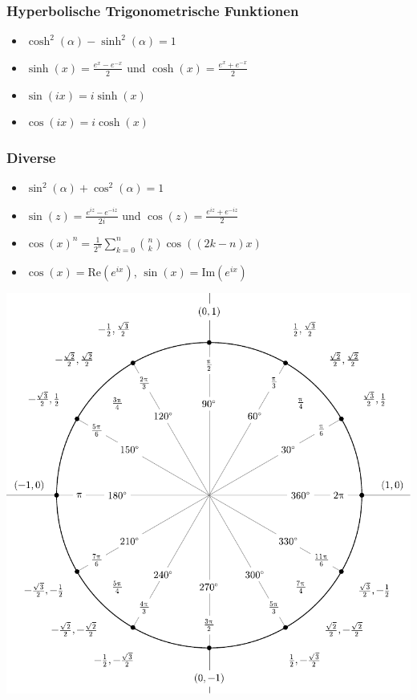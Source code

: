 \documentclass[a4paper,10pt]{article}
\def\Re{\text{Re}}
\def\Im{\text{Im}}
\begin{document}
\subsubsection{Hyperbolische Trigonometrische Funktionen}
\begin{itemize}
  \item $\cosh^2(\alpha) - \sinh^2(\alpha) = 1$
  \item $\sinh(x) = \frac{e^x - e^{-x}}{2}$ und $\cosh(x) = \frac{e^x + e^{-x}}{2}$
  \item $\sin(ix) = i \sinh(x)$
  \item $\cos(ix) = i \cosh(x)$
 \end{itemize}

\subsubsection{Diverse}

\begin{itemize}
 \item $\sin^2(\alpha) + \cos^2(\alpha) = 1$
 \item $\sin(z) = \frac{e^{iz} - e^{-iz}}{2i}$ und $\cos(z) = \frac{e^{iz} + e^{-iz}}{2}$
 \item $\cos(x)^n = \frac{1}{2^n} \sum_{k=0}^n {n \choose k} \cos((2k - n)x)$
 \item $\cos(x) = \Re(e^{ix})$, $\sin(x) = \Im(e^{ix})$
\end{itemize}


\begin{center}
  \includegraphics[width= \linewidth]{include_degrees_circle.pdf}
\end{center}
\end{document}
